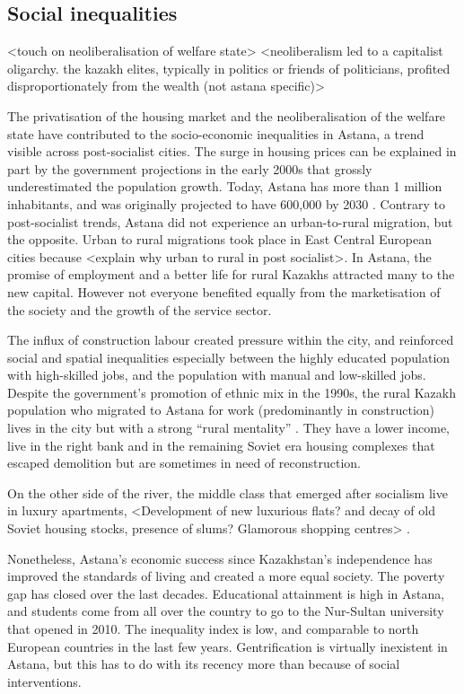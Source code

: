 \documentclass{article}
\begin{document}
\subsection{Social inequalities}

<touch on neoliberalisation of welfare state> 
<neoliberalism led to a capitalist oligarchy. the kazakh elites, typically in politics or friends of politicians, profited disproportionately from the wealth (not astana specific)>

The privatisation of the housing market and the neoliberalisation of the welfare state have contributed to the socio-economic inequalities in Astana, a trend visible across post-socialist cities. The surge in housing prices can be explained in part by the government projections in the early 2000s that grossly underestimated the population growth. Today, Astana has more than 1 million inhabitants, and was originally projected to have 600,000 by 2030 \parencite{masterplan2001}. Contrary to post-socialist trends, Astana did not experience an urban-to-rural migration, but the opposite. Urban to rural migrations took place in East Central European cities because <explain why urban to rural in post socialist>. In Astana, the promise of employment and a better life for rural Kazakhs attracted many to the new capital. However not everyone benefited equally from the marketisation of the society and the growth of the service sector.

The influx of construction labour created pressure within the city, and reinforced social and spatial inequalities especially between the highly educated population with high-skilled jobs, and the population with manual and low-skilled jobs.
Despite the government's promotion of ethnic mix in the 1990s, the rural Kazakh population who migrated to Astana for work (predominantly in construction) lives in the city but with a strong ``rural mentality'' \parencite{koch2014bordering}. They have a lower income, live in the right bank and in the remaining Soviet era housing complexes that escaped demolition but are sometimes in need of reconstruction.

On the other side of the river, the middle class that emerged after socialism live in luxury apartments,  <Development of new luxurious flats? and decay of old Soviet housing stocks, presence of slums? Glamorous shopping centres> \parencite{todo}.

Nonetheless, Astana's economic success since Kazakhstan's independence has improved the standards of living and created a more equal society. The poverty gap has closed over the last decades. Educational attainment is high in Astana, and students come from all over the country to go to the Nur-Sultan university that opened in 2010. The inequality index is low, and comparable to north European countries in the last few years. Gentrification is virtually inexistent in Astana, but this has to do with its recency more than because of social interventions.
\end{document}
